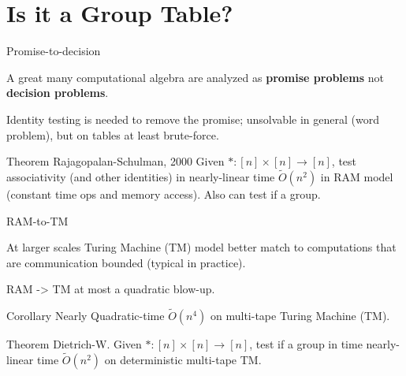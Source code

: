 \documentclass{beamer}
\begin{document}



\section{Is it a Group Table?}

\begin{frame}{Promise-to-decision}

A great many computational algebra are analyzed as \textbf{promise problems}
not \textbf{decision problems}.

Identity testing is needed to remove the promise; unsolvable in general (word problem), 
but on tables at least brute-force.
\pause

\begin{block}{Theorem Rajagopalan-Schulman, 2000}
    Given $*:[n]\times [n]\to [n]$, test associativity (and other identities) in
    nearly-linear time $\tilde{O}(n^2)$ in RAM model (constant time ops and
    memory access). Also can test if a group.
\end{block}

\end{frame}

\begin{frame}{RAM-to-TM}

At larger scales Turing Machine (TM) model better match to computations 
that are communication bounded (typical in practice).

RAM -> TM at most a quadratic blow-up.
\begin{block}{Corollary}
Nearly Quadratic-time $\tilde{O}(n^4)$ on multi-tape Turing Machine (TM).
\end{block}

\pause
\begin{block}{Theorem Dietrich-W.}
    Given $*:[n]\times [n]\to [n]$,
    test if a group in time nearly-linear time
    $\tilde{O}(n^2)$ on deterministic multi-tape TM.
\end{block}

\end{frame}
\end{document}
